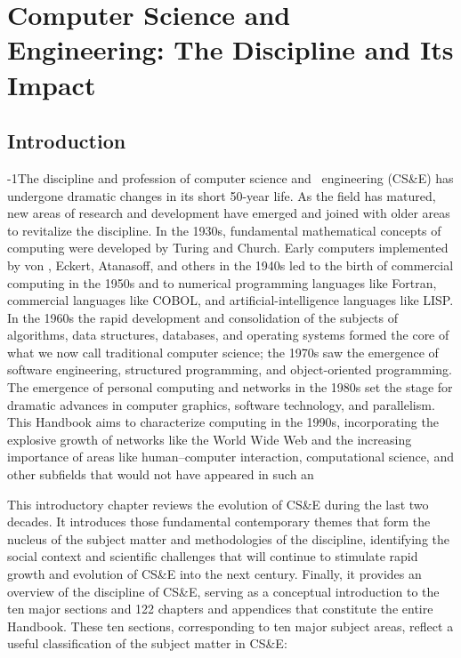 \chapter{Computer Science and Engineering: The Discipline and
Its Impact}


\begin{chapterauthors}
\end{chapterauthors}

\section{Introduction}
\label{sec1}

\noindent 
\looseness-1The discipline and profession of computer science and~\cite{article-minimal}
engineering (CS\&E) has undergone dramatic changes in its short
50-year life. As the field has matured, new areas of research
and development have emerged and joined with older areas to
revitalize the discipline. In the 1930s, fundamental
mathematical concepts of computing were developed by Turing and
Church. Early computers implemented by von , Eckert,
Atanasoff, and others in the 1940s led to the birth of
commercial computing in the 1950s and to numerical programming
languages like Fortran, commercial languages like COBOL, and
artificial-intelligence languages like LISP. In the 1960s the
rapid development and consolidation of the subjects of~\cite{article-shibu}
algorithms, data structures, databases, and operating systems
formed the core of what we now call traditional computer science;
the 1970s  saw the emergence of software engineering, structured
programming, and object-oriented programming. The emergence of
personal computing and networks in the 1980s set the stage for
dramatic advances in computer graphics, software technology, and
parallelism. This Handbook aims to characterize computing in the
1990s, incorporating the explosive growth of networks like the
World Wide Web and the increasing importance of areas like
human--computer interaction, computational science, and other
subfields that would not have appeared in such an

This introductory chapter reviews the evolution\cite{article-suresh} of CS\&E during
the last two decades. It introduces those fundamental
contemporary themes that form the nucleus of the subject matter
and methodologies of the discipline, identifying the social
context and scientific challenges that will continue to stimulate
rapid growth and evolution of CS\&E  into the next century.
Finally, it provides an overview of the discipline of CS\&E,
serving as a conceptual introduction to the ten major sections
and 122 chapters and appendices that constitute the entire Handbook. These ten
sections, corresponding to ten major subject areas, reflect a
useful classification of the subject matter in CS\&E:

